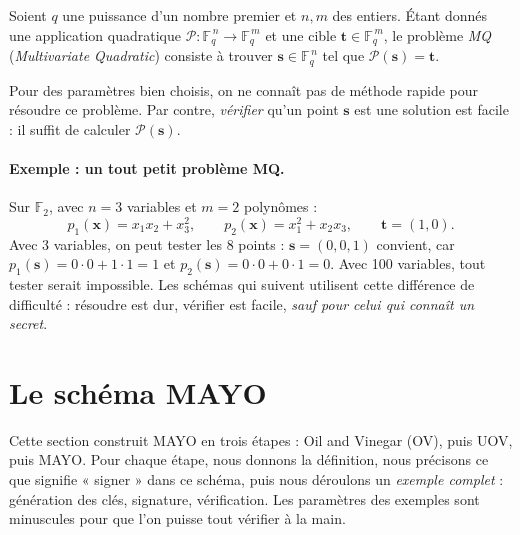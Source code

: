 \begin{definition}
Soient $q$ une puissance d'un nombre premier et $n,m$ des entiers. Étant donnés une application quadratique $\mathcal{P}:\mathbb{F}_q^{\,n}\to\mathbb{F}_q^{\,m}$ et une cible $\mathbf{t}\in\mathbb{F}_q^{\,m}$, le problème \emph{MQ} (\emph{Multivariate Quadratic}) consiste à trouver $\mathbf{s}\in\mathbb{F}_q^{\,n}$ tel que $\mathcal{P}(\mathbf{s})=\mathbf{t}$.
\end{definition}
Pour des paramètres bien choisis, on ne connaît pas de méthode rapide pour résoudre ce problème. Par contre, \emph{vérifier} qu'un point $\mathbf{s}$ est une solution est facile : il suffit de calculer $\mathcal{P}(\mathbf{s})$.

\paragraph{Exemple : un tout petit problème MQ.} Sur $\mathbb{F}_2$, avec $n=3$ variables et $m=2$ polynômes :
\[p_1(\mathbf{x})=x_1x_2+x_3^2,\qquad p_2(\mathbf{x})=x_1^2+x_2x_3,\qquad \mathbf{t}=(1,0).\]
Avec 3 variables, on peut tester les 8 points : $\mathbf{s}=(0,0,1)$ convient, car $p_1(\mathbf{s})=0\cdot0+1\cdot1=1$ et $p_2(\mathbf{s})=0\cdot0+0\cdot1=0$. Avec 100 variables, tout tester serait impossible. Les schémas qui suivent utilisent cette différence de difficulté : résoudre est dur, vérifier est facile, \emph{sauf pour celui qui connaît un secret}.

\section{Le schéma MAYO}\label{sec:schema}
Cette section construit MAYO en trois étapes : Oil and Vinegar (OV), puis UOV, puis MAYO. Pour chaque étape, nous donnons la définition, nous précisons ce que signifie « signer » dans ce schéma, puis nous déroulons un \emph{exemple complet} : génération des clés, signature, vérification. Les paramètres des exemples sont minuscules pour que l'on puisse tout vérifier à la main.

